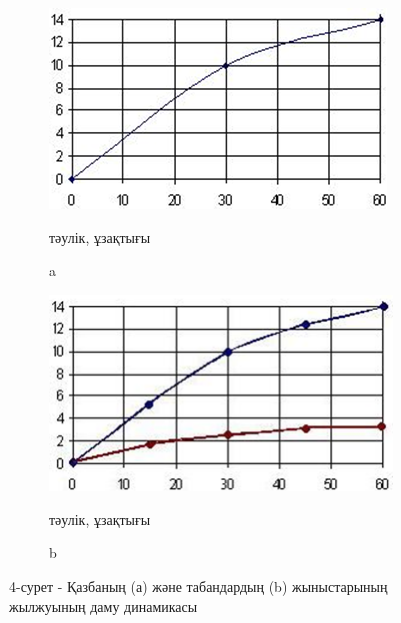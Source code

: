 \begin{figure}[H]
    \centering
    \begin{subfigure}[b]{0.45\textwidth}
        \centering
        \includegraphics[width=\linewidth]{assets/1324}
		\caption*{тәулік, ұзақтығы}
		\caption*{a}
    \end{subfigure}
    \hfill
    \begin{subfigure}[b]{0.45\textwidth}
        \centering
        \includegraphics[width=\linewidth]{assets/1325}
		\caption*{тәулік, ұзақтығы}
		\caption*{b}
    \end{subfigure}
  \caption*{4-сурет - Қазбаның (а) және табандардың (b) жыныстарының жылжуының даму динамикасы}
\end{figure}

